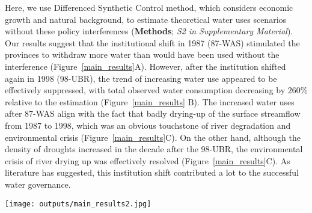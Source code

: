 Here, we use Differenced Synthetic Control method, which considers economic growth and natural background, to estimate theoretical water uses scenarios without these policy interferences (\textbf{Methods}; \textit{S2 in Supplementary Material}).
Our results suggest that the institutional shift in 1987 (87-WAS) stimulated the provinces to withdraw more water than would have been used without the interference (Figure~\ref{main_results}A).
However, after the institution shifted again in 1998 (98-UBR), the trend of increasing water use appeared to be effectively suppressed, with total observed water consumption decreasing by $260\%$ relative to the estimation (Figure~\ref{main_results} B).
The increased water uses after 87-WAS align with the fact that badly drying-up of the surface streamflow from 1987 to 1998, which was an obvious touchstone of river degradation and environmental crisis (Figure~\ref{main_results}C).
On the other hand, although the density of droughts increased in the decade after the 98-UBR, the environmental crisis of river drying up was effectively resolved (Figure~\ref{main_results}C).
As literature has suggested, this institution shift contributed a lot to the successful water governance.

\begin{figure*}[!h]
    \centering
    \texttt{[image: outputs/main\_results2.jpg]}
    \caption{
        Effects of two institutional shifts on water resources use and allocation in the Yellow River Basin (YRB).
        \textbf{A.} water uses of the YRB before and after the institutional shift in 1987 (87-WAS);
        \textbf{B.} water uses of the YRB before and after the institutional shift in 1998 (98-UBR). While the blue lines are statistic water use data, the grey ones are the estimation from the Differenced Synthetic Control method with economic and environmental background controlled.
        \textbf{C.} Drought intensity in the YRB and drying up events of the Yellow River. Size of the grey bubbles denotes the length of a drying up stream.
    }
    \label{main_results}
\end{figure*}


